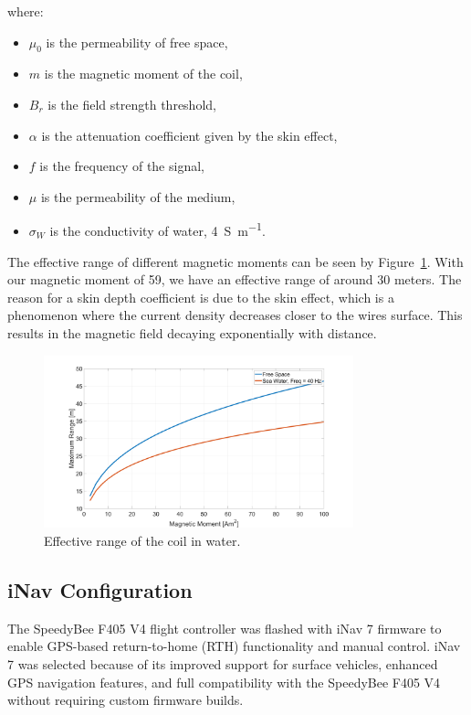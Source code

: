 where:
\begin{itemize}
    \item \( \mu_0 \) is the permeability of free space,
    \item \( m \) is the magnetic moment of the coil,
    \item \( B_r \) is the field strength threshold,
    \item \( \alpha \) is the attenuation coefficient given by the skin effect,
    \item \( f \) is the frequency of the signal,
    \item \( \mu \) is the permeability of the medium,
    \item \( \sigma_W \) is the conductivity of water, \SI{4 }{\siemens \per \meter}.
\end{itemize}

The effective range of different magnetic moments can be seen by Figure~\ref{fig:Effective Range}. With our magnetic moment of 59, we have an effective range of around 30 meters. The reason for a skin depth coefficient is due to the skin effect, which is a phenomenon where the current density decreases closer to the wires surface. This results in the magnetic field decaying exponentially with distance. 
\begin{figure}[H]
    \centering
    \includegraphics[width=0.8\textwidth]{Magnetic_Moment.png}
    \caption{Effective range of the coil in water.}
\label{fig:Effective Range}
\end{figure}
\subsection{iNav Configuration}

The SpeedyBee F405 V4 flight controller was flashed with iNav 7 firmware to enable GPS-based return-to-home (RTH) functionality and manual control. iNav 7 was selected because of its improved support for surface vehicles, enhanced GPS navigation features, and full compatibility with the SpeedyBee F405 V4 without requiring custom firmware builds.

